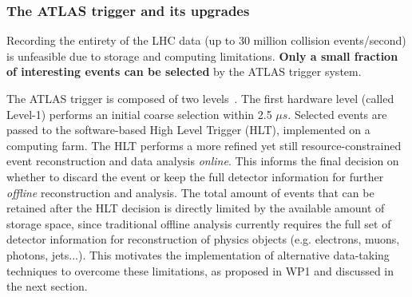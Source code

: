 \subsubsection{The ATLAS trigger and its upgrades}
\smallskip

Recording the entirety of the LHC data (up to 30 million collision events/second) is unfeasible due to storage and computing limitations. 
\textbf{Only a small fraction of interesting events can be selected} by the ATLAS trigger system. %

The ATLAS trigger is composed of two levels~\cite{ToBeCited}. %
The first hardware level (called Level-1) performs an initial coarse selection within 2.5 $\mu s$. 
Selected events are passed to the software-based High Level Trigger (HLT), implemented on a computing farm. 
The HLT performs a more refined yet still resource-constrained event reconstruction and data analysis \textit{online}. 
This informs the final decision on whether to discard the event or keep the full detector information for further \textit{offline} reconstruction and analysis. 
The total amount of events that can be retained after the HLT decision is directly limited by the available amount of storage space, 
since traditional offline analysis currently requires the full set of detector information for reconstruction of physics objects (e.g. electrons, muons, photons, jets...). 
This motivates the implementation of alternative data-taking techniques to overcome these limitations, as proposed in WP1 and discussed in the next section. 

